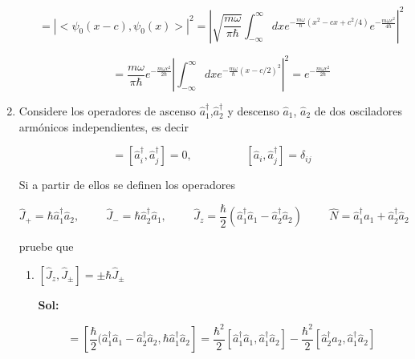 \documentclass[12pt,a4paper]{article}
\begin{document}
\begin{enumerate}
\begin{enumerate}
    \begin{equation*}
        = |<\psi_{0}(x-c),\psi_{0}(x)>|^2 = \left|\sqrt{\frac{m \omega}{\pi \hbar}} \int_{-\infty}^{\infty} dx e^{- \frac{m\omega}{\hbar}(x^2 -cx+c^2/4 )} e^{-\frac{m\omega c^2}{4 \hbar} } \right|^2
    \end{equation*}
    
    \begin{equation*}
        = \frac{m \omega}{\pi \hbar} e^{- \frac{m \omega c^2}{2 \hbar}} \left|\int_{-\infty}^{\infty} dx e^{-\frac{m \omega}{\hbar} (x-c/2)^2}\right|^2 = e^{- \frac{m \omega c^2}{2 \hbar}} 
    \end{equation*}
    
    
\end{enumerate}






\item Considere los operadores de ascenso $\hat{a}_{1}^{\dagger}$,$\hat{a}_{2}^{\dagger}$ y descenso $\hat{a}_1$, $\hat{a}_2$ de dos osciladores armónicos independientes, es decir

\begin{equation*}
    [\hat{a}_i,\hat{a}_j] = [\hat{a}_{i}^{\dagger},\hat{a}_{j}^{\dagger}] = 0, \hspace{2cm} [\hat{a}_i , \hat{a}_{j}^{\dagger}] = \delta_{ij}
\end{equation*}

Si a partir de ellos se definen los operadores 

\begin{equation*}
    \hat{J}_{+}= \hbar \hat{a}_{1}^{\dagger} \hat{a}_{2},\hspace{1cm} \hat{J}_{-} = \hbar \hat{a}_{2}^{\dagger}\hat{a}_{1}, \hspace{1cm} \hat{J}_{z} = \frac{\hbar}{2} (\hat{a}_{1}^{\dagger}\hat{a}_1 - \hat{a}_{2}^{\dagger}\hat{a}_2) \hspace{1cm} \hat{N} = \hat{a}_{1}^{\dagger}\hat{a}_1 + \hat{a}_{2}^{\dagger}\hat{a}_2
\end{equation*}

pruebe que 

\begin{enumerate}
    \item $[\hat{J}_{z},\hat{J}_{\pm}] = \pm \hbar \hat{J}_{\pm}$
    
    \textbf{Sol:}
    
    \begin{equation*}
        [\hat{J}_{z},\hat{J}_{+}] = [\frac{\hbar}{2} (\hat{a}_{1}^{\dagger} \hat{a}_{1} - \hat{a}_{2}^{\dagger} \hat{a}_{2}, \hbar \hat{a}_{1}^{\dagger} \hat{a}_2 ] = \frac{\hbar^2}{2}[\hat{a}_{1}^{\dagger}\hat{a}_{1}, \hat{a}_{1}^{\dagger}\hat{a}_{2}] - \frac{\hbar^2}{2}[\hat{a}_{2}^{\dagger}\hat{a}_{2},\hat{a}_{1}^{\dagger}\hat{a}_{2}]
    \end{equation*}
    

\end{enumerate}
\end{enumerate}
\end{document}

